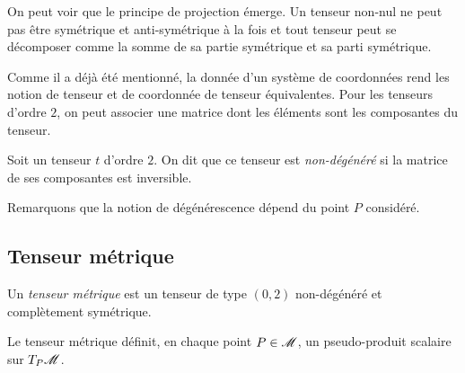 \documentclass[a4paper,11pt]{report}
\begin{document}
                \begin{rmk}
                    On peut voir que le principe de projection émerge. Un tenseur non-nul ne peut pas être symétrique et anti-symétrique à la fois et tout tenseur peut se décomposer comme la somme de sa partie symétrique et sa parti symétrique.
                \end{rmk}
                
                Comme il a déjà été mentionné, la donnée d'un système de coordonnées rend les notion de tenseur et de coordonnée de tenseur équivalentes. Pour les tenseurs d'ordre $2$, on peut associer une matrice dont les éléments sont les composantes du tenseur.\\
                
                \begin{defn}
                    Soit un tenseur $t$ d'ordre $2$. On dit que ce tenseur est \textit{non-dégénéré} si la matrice de ses composantes est inversible.
                \end{defn}
                
                Remarquons que la notion de dégénérescence dépend du point $P$ considéré.
                
            \subsection{Tenseur métrique}
                
                \begin{defn}
                    Un \textit{tenseur métrique} est un tenseur de type $(0,2)$ non-dégénéré et complètement symétrique.
                \end{defn}
                
                \begin{prop}\begin{leftbar}
                    Le tenseur métrique définit, en chaque point $P\in\mathscr{M}$, un pseudo-produit scalaire sur $T_P\mathscr{M}$.
                \end{leftbar}\end{prop}
                
\end{document}
